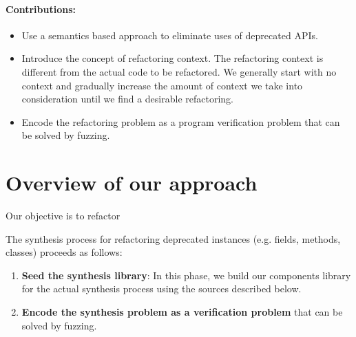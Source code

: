 \documentclass[runningheads,a4paper]{llncs}
\begin{document}
\paragraph{Contributions:}

\begin{itemize}

\item Use a semantics based approach to eliminate uses of deprecated APIs.

\item Introduce the concept of refactoring context. The refactoring context is different from the
  actual code to be refactored.
  We generally start
  with no context and gradually increase the amount of context we take into consideration
  until we find a desirable refactoring.
  
\item Encode the refactoring problem as a program verification problem that can be solved
  by fuzzing.
  
\end{itemize}  

%



\section{Overview of our approach} \label{sec:approach}

Our objective is to refactor 

The synthesis process for refactoring deprecated instances (e.g. fields, methods, classes) proceeds as follows:
\begin{enumerate}
\item {\bf Seed the synthesis library}: In this phase, we build our components library for the actual synthesis process using the sources described below.  
\item {\bf Encode the synthesis problem as a verification problem} that can be solved by fuzzing.
\end{enumerate}
  
\end{document}
